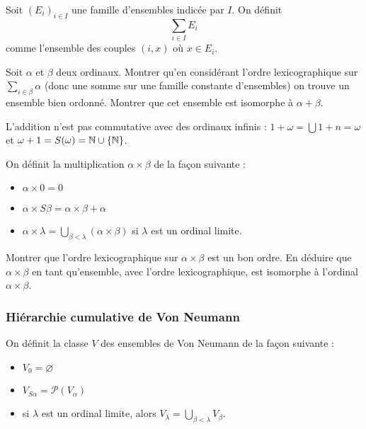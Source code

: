 \begin{exo}
    Soit $(E_i)_{i\in I}$ une famille d'ensembles indicée par $I$. On définit $$\sum_{i\in I}E_i$$ comme l'ensemble des couples $(i,x)$ où $x\in E_i$.

    Soit $\alpha$ et $\beta$ deux ordinaux. Montrer qu'en considérant l'ordre lexicographique sur $\sum_{i \in \beta} \alpha$ (donc une somme sur une famille constante d'ensembles) on trouve un ensemble bien ordonné. Montrer que cet ensemble est isomorphe à $\alpha + \beta$.
\end{exo}

\begin{rmk}
    L'addition n'est pas commutative avec des ordinaux infinis : $1+\omega = \bigcup 1+n = \omega$ et $\omega + 1 = S(\omega) = \mathbb{N}\cup\{\mathbb{N}\}$.
\end{rmk}

\begin{defi}
    On définit la multiplication $\alpha \times \beta$ de la façon suivante :
    \begin{itemize}[label=$\bullet$]
        \item $\alpha \times 0 = 0$
        \item $\alpha \times S \beta = \alpha \times \beta + \alpha$
        \item $\alpha \times \lambda = \displaystyle{\bigcup_{\beta < \lambda}(\alpha \times \beta)}$ si $\lambda$ est un ordinal limite.
    \end{itemize}
\end{defi}

\begin{exo}
    Montrer que l'ordre lexicographique sur $\alpha \times \beta$ est un bon ordre. En déduire que $\alpha \times \beta$ en tant qu'ensemble, avec l'ordre lexicographique, est isomorphe à l'ordinal $\alpha \times \beta$.
\end{exo}

\subsubsection{Hiérarchie cumulative de Von Neumann}

On définit la classe $V$ des ensembles de Von Neumann de la façon suivante :

\begin{itemize}[label=$\bullet$]
    \item $V_0 = \varnothing$
    \item $V_{S \alpha} = \mathcal P (V_\alpha)$
    \item si $\lambda$ est un ordinal limite, alors $V_{\lambda} = \bigcup_{\beta < \lambda} V_\beta$.
\end{itemize}

